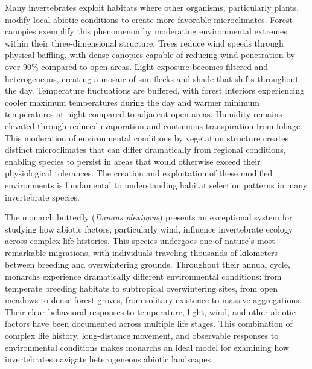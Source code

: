Many invertebrates exploit habitats where other organisms, particularly plants, modify local abiotic conditions to create more favorable microclimates. Forest canopies exemplify this phenomenon by moderating environmental extremes within their three-dimensional structure. Trees reduce wind speeds through physical baffling, with dense canopies capable of reducing wind penetration by over 90\% compared to open areas. Light exposure becomes filtered and heterogeneous, creating a mosaic of sun flecks and shade that shifts throughout the day. Temperature fluctuations are buffered, with forest interiors experiencing cooler maximum temperatures during the day and warmer minimum temperatures at night compared to adjacent open areas. Humidity remains elevated through reduced evaporation and continuous transpiration from foliage. This moderation of environmental conditions by vegetation structure creates distinct microclimates that can differ dramatically from regional conditions, enabling species to persist in areas that would otherwise exceed their physiological tolerances. The creation and exploitation of these modified environments is fundamental to understanding habitat selection patterns in many invertebrate species.

The monarch butterfly (\textit{Danaus plexippus}) presents an exceptional system for studying how abiotic factors, particularly wind, influence invertebrate ecology across complex life histories. This species undergoes one of nature's most remarkable migrations, with individuals traveling thousands of kilometers between breeding and overwintering grounds. Throughout their annual cycle, monarchs experience dramatically different environmental conditions: from temperate breeding habitats to subtropical overwintering sites, from open meadows to dense forest groves, from solitary existence to massive aggregations. Their clear behavioral responses to temperature, light, wind, and other abiotic factors have been documented across multiple life stages. This combination of complex life history, long-distance movement, and observable responses to environmental conditions makes monarchs an ideal model for examining how invertebrates navigate heterogeneous abiotic landscapes.

